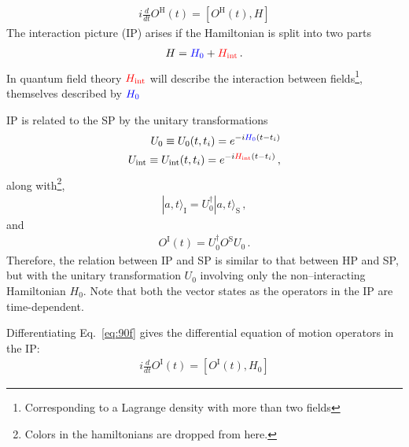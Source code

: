 \begin{align}
  i\frac{d}{dt}O^{\text{H}}(t)=\left[O^{\text{H}}(t),H\right]
\end{align}
The interaction picture (IP) arises if the Hamiltonian is split into two parts
\begin{align}
  H={\color{blue} H_{0}}+{\color{red} H_{\text{int}}}\,.
\end{align}
In quantum field theory ${\color{red} H_{\text{int}}}$ will describe the interaction between fields\footnote{Corresponding to a Lagrange density with more than two fields}, themselves described by ${\color{blue} H_{0}}$

IP is related to the SP by the unitary transformations
\begin{align}
\label{eq:88f}
  U_{0}\equiv U_{0}(t,t_i)=e^{-i {\color{blue} H_0}(t-t_i)}\nonumber\\
  U_{\text{int}}\equiv U_{\text{int}}(t,t_i)=e^{-i {\color{red} H_{\text{int}}}(t-t_i)}\,,
\end{align}
along with\footnote{Colors in the hamiltonians are dropped from here.},
\begin{align}
\label{eq:89f}
  |a,t\rangle_{\text{I}}=U_0^\dagger|a,t\rangle_{\text{S}}\,,
\end{align}
and
\begin{align}
\label{eq:90f}
  O^{\text{I}}(t)=U^\dagger_0 O^{\text{S}}U_0\,.
\end{align}
Therefore, the relation between IP and SP is similar to that between HP and SP, but with the unitary transformation $U_0$ involving only the non--interacting Hamiltonian $H_0$. Note that both the vector states as the operators in the IP are time-dependent.

Differentiating Eq.~\eqref{eq:90f} gives the differential equation of motion operators in the IP:
\begin{align}
  i\frac{d}{dt}O^{\text{I}}(t)=\left[O^{\text{I}}(t),H_0\right]
\end{align}

